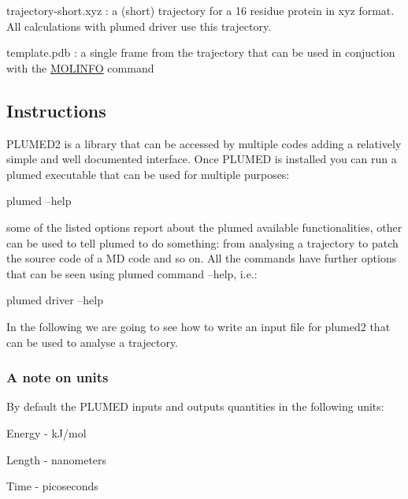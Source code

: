 \begin{DoxyItemize}
\item trajectory-\/short.\+xyz \+: a (short) trajectory for a 16 residue protein in xyz format. All calculations with plumed driver use this trajectory.
\item template.\+pdb \+: a single frame from the trajectory that can be used in conjuction with the \hyperlink{MOLINFO}{M\+O\+L\+I\+N\+F\+O} command
\end{DoxyItemize}\hypertarget{belfast-10_Instructions}{}\subsection{Instructions}\label{belfast-10_Instructions}
P\+L\+U\+M\+E\+D2 is a library that can be accessed by multiple codes adding a relatively simple and well documented interface. Once P\+L\+U\+M\+E\+D is installed you can run a plumed executable that can be used for multiple purposes\+:

\begin{DoxyVerb}plumed --help 
\end{DoxyVerb}


some of the listed options report about the plumed available functionalities, other can be used to tell plumed to do something\+: from analysing a trajectory to patch the source code of a M\+D code and so on. All the commands have further options that can be seen using plumed command --help, i.\+e.\+:

\begin{DoxyVerb}plumed driver --help
\end{DoxyVerb}


In the following we are going to see how to write an input file for plumed2 that can be used to analyse a trajectory.\hypertarget{belfast-1_Units}{}\subsubsection{A note on units}\label{belfast-1_Units}
By default the P\+L\+U\+M\+E\+D inputs and outputs quantities in the following units\+:


\begin{DoxyItemize}
\item Energy -\/ k\+J/mol
\item Length -\/ nanometers
\item Time -\/ picoseconds
\end{DoxyItemize}

